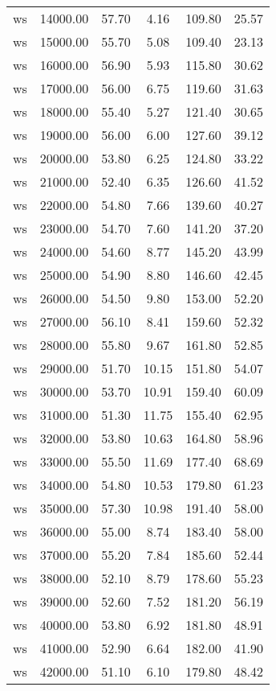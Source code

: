 \begin{table}[ht]
\begin{table}[ht]
\begin{tabular}{|cccccc}
  ws & 14000.00 & 57.70 & 4.16 & 109.80 & 25.57 \\ 
  ws & 15000.00 & 55.70 & 5.08 & 109.40 & 23.13 \\ 
  ws & 16000.00 & 56.90 & 5.93 & 115.80 & 30.62 \\ 
  ws & 17000.00 & 56.00 & 6.75 & 119.60 & 31.63 \\ 
  ws & 18000.00 & 55.40 & 5.27 & 121.40 & 30.65 \\ 
  ws & 19000.00 & 56.00 & 6.00 & 127.60 & 39.12 \\ 
  ws & 20000.00 & 53.80 & 6.25 & 124.80 & 33.22 \\ 
  ws & 21000.00 & 52.40 & 6.35 & 126.60 & 41.52 \\ 
  ws & 22000.00 & 54.80 & 7.66 & 139.60 & 40.27 \\ 
  ws & 23000.00 & 54.70 & 7.60 & 141.20 & 37.20 \\ 
  ws & 24000.00 & 54.60 & 8.77 & 145.20 & 43.99 \\ 
  ws & 25000.00 & 54.90 & 8.80 & 146.60 & 42.45 \\ 
  ws & 26000.00 & 54.50 & 9.80 & 153.00 & 52.20 \\ 
  ws & 27000.00 & 56.10 & 8.41 & 159.60 & 52.32 \\ 
  ws & 28000.00 & 55.80 & 9.67 & 161.80 & 52.85 \\ 
  ws & 29000.00 & 51.70 & 10.15 & 151.80 & 54.07 \\ 
  ws & 30000.00 & 53.70 & 10.91 & 159.40 & 60.09 \\ 
  ws & 31000.00 & 51.30 & 11.75 & 155.40 & 62.95 \\ 
  ws & 32000.00 & 53.80 & 10.63 & 164.80 & 58.96 \\ 
  ws & 33000.00 & 55.50 & 11.69 & 177.40 & 68.69 \\ 
  ws & 34000.00 & 54.80 & 10.53 & 179.80 & 61.23 \\ 
  ws & 35000.00 & 57.30 & 10.98 & 191.40 & 58.00 \\ 
  ws & 36000.00 & 55.00 & 8.74 & 183.40 & 58.00 \\ 
  ws & 37000.00 & 55.20 & 7.84 & 185.60 & 52.44 \\ 
  ws & 38000.00 & 52.10 & 8.79 & 178.60 & 55.23 \\ 
  ws & 39000.00 & 52.60 & 7.52 & 181.20 & 56.19 \\ 
  ws & 40000.00 & 53.80 & 6.92 & 181.80 & 48.91 \\ 
  ws & 41000.00 & 52.90 & 6.64 & 182.00 & 41.90 \\ 
  ws & 42000.00 & 51.10 & 6.10 & 179.80 & 48.42 \\ 

\end{tabular}
\end{table}
\end{table}
